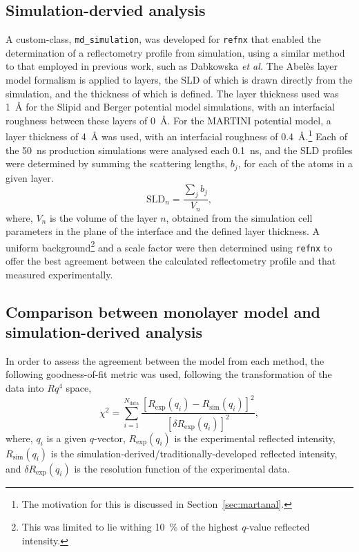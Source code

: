 \subsection{Simulation-dervied analysis}
A custom-class, \texttt{md\_simulation}, was developed for \texttt{refnx} that enabled the determination of a reflectometry profile from simulation, using a similar method to that employed in previous work, such as Dabkowska \emph{et al.}
The Abel\`{e}s layer model formalism is applied to layers, the SLD of which is drawn directly from the simulation, and the thickness of which is defined.
The layer thickness used was \SI{1}{\angstrom} for the Slipid and Berger potential model simulations, with an interfacial roughness between these layers of \SI{0}{\angstrom}.
For the MARTINI potential model, a layer thickness of \SI{4}{\angstrom} was used, with an interfacial roughness of \SI{0.4}{\angstrom}.\footnote{The motivation for this is discussed in Section~\ref{sec:martanal}.}
Each of the \SI{50}{\nano\second} production simulations were analysed each \SI{0.1}{\nano\second}, and the SLD profiles were determined by summing the scattering lengths, $b_j$, for each of the atoms in a given layer.
%
\begin{equation}
\text{SLD}_n = \frac{\sum_j b_j}{V_n},
\end{equation}
%
where, $V_n$ is the volume of the layer $n$, obtained from the simulation cell parameters in the plane of the interface and the defined layer thickness.
A uniform background\footnote{This was limited to lie withing \SI{10}{\percent} of the highest $q$-value reflected intensity.} and a scale factor were then determined using \texttt{refnx} to offer the best agreement between the calculated reflectometry profile and that measured experimentally.

\subsection{Comparison between monolayer model and simulation-derived analysis}
In order to assess the agreement between the model from each method, the following goodness-of-fit metric was used, following the transformation of the data into $Rq^4$ space,
%
\begin{equation}
\chi^2 = \sum_{i=1}^{N_{\text{data}}}{\frac{[R_{\text{exp}}(q_i) - R_{\text{sim}}(q_i)]^2}{[\delta R_{\text{exp}}(q_i)]^2}},
\end{equation}
%
where, $q_i$ is a given $q$-vector, $R_{\text{exp}}(q_i)$ is the experimental reflected intensity, $R_{\text{sim}}(q_i)$ is the simulation-derived/traditionally-developed reflected intensity, and $\delta R_{\text{exp}}(q_i)$ is the resolution function of the experimental data.

